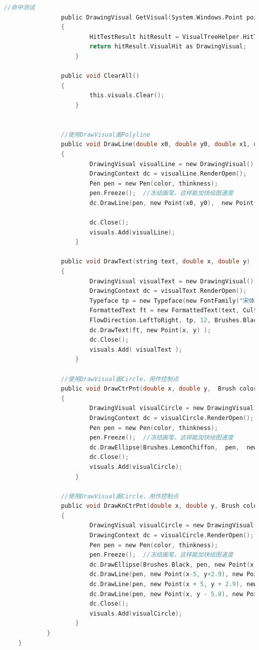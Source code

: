 \begin{lstlisting}[language=C]
				//命中测试
				public DrawingVisual GetVisual(System.Windows.Point point)
				{
						HitTestResult hitResult = VisualTreeHelper.HitTest(this, point);
						return hitResult.VisualHit as DrawingVisual;
					}

				public void ClearAll()
				{
						this.visuals.Clear();
					}


				//使用DrawVisual画Polyline
				public void DrawLine(double x0, double y0, double x1, double y1,  Brush color, double thinkness)
				{
						DrawingVisual visualLine = new DrawingVisual();
						DrawingContext dc = visualLine.RenderOpen();
						Pen pen = new Pen(color, thinkness);
						pen.Freeze();  //冻结画笔，这样能加快绘图速度
						dc.DrawLine(pen, new Point(x0, y0),  new Point(x1, y1) );

						dc.Close();
						visuals.Add(visualLine);
					}

				public void DrawText(string text, double x, double y)
				{
						DrawingVisual visualText = new DrawingVisual();
						DrawingContext dc = visualText.RenderOpen();
						Typeface tp = new Typeface(new FontFamily("宋体"), FontStyles.Normal, FontWeights.Normal, FontStretches.Normal);
						FormattedText ft = new FormattedText(text, CultureInfo.CurrentCulture,
						FlowDirection.LeftToRight, tp, 12, Brushes.Black);
						dc.DrawText(ft, new Point(x, y) );
						dc.Close();
						visuals.Add( visualText );
					}

				//使用DrawVisual画Circle，用作控制点
				public void DrawCtrPnt(double x, double y,  Brush color, double thinkness)
				{
						DrawingVisual visualCircle = new DrawingVisual();
						DrawingContext dc = visualCircle.RenderOpen();
						Pen pen = new Pen(color, thinkness);
						pen.Freeze();  //冻结画笔，这样能加快绘图速度
						dc.DrawEllipse(Brushes.LemonChiffon,  pen,  new Point(x, y),  5, 5);
						dc.Close();
						visuals.Add(visualCircle);
					}

				//使用DrawVisual画Circle，用作控制点
				public void DrawKnCtrPnt(double x, double y, Brush color, double thinkness)
				{
						DrawingVisual visualCircle = new DrawingVisual();
						DrawingContext dc = visualCircle.RenderOpen();
						Pen pen = new Pen(color, thinkness);
						pen.Freeze();  //冻结画笔，这样能加快绘图速度
						dc.DrawEllipse(Brushes.Black, pen, new Point(x, y), 1, 1);
						dc.DrawLine(pen, new Point(x-5, y+2.9), new Point(x+5, y+2.9));
						dc.DrawLine(pen, new Point(x + 5, y + 2.9), new Point(x, y - 5.8));
						dc.DrawLine(pen, new Point(x, y - 5.8), new Point(x - 5, y + 2.9));
						dc.Close();
						visuals.Add(visualCircle);
					}
			}
	}

 \end{lstlisting}
